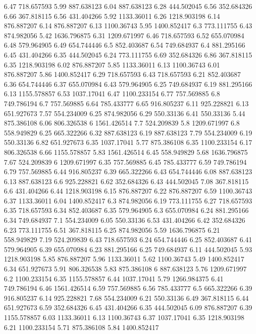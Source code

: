 6.47	718.657593
5.99	887.638123
6.04	887.638123
6.28	444.502045
6.56	352.684326
6.66	367.818115
6.56	431.404266
5.92	1133.36011
6.26	1218.903198
6.14	876.887207
6.14	876.887207
6.13	1100.36743
5.95	1400.852417
6.3	773.111755
6.43	874.982056
5.42	1636.796875
6.31	1209.671997
6.46	718.657593
6.52	655.070984
6.48	579.964905
6.49	654.744446
6.5	852.403687
6.54	749.684937
6.4	881.295166
6.45	431.404266
6.35	444.502045
6.24	773.111755
6.69	352.684326
6.86	367.818115
6.35	1218.903198
6.02	876.887207
5.85	1133.36011
6.13	1100.36743
6.01	876.887207
5.86	1400.852417
6.29	718.657593
6.43	718.657593
6.21	852.403687
6.36	654.744446
6.37	655.070984
6.43	579.964905
6.25	749.684937
6.19	881.295166
6.13	1155.578857
6.53	1037.17041
6.47	1100.233154
6.77	757.569885
6.8	749.786194
6.7	757.569885
6.64	785.433777
6.65	916.805237
6.11	925.228821
6.13	651.927673
7.57	554.234009
6.25	874.982056
6.29	550.33136
6.41	550.33136
5.44	875.386108
6.06	806.326538
6	1561.426514
7.7	524.209839
5.8	1209.671997
6.8	558.949829
6.25	665.322266
6.32	887.638123
6.19	887.638123
7.79	554.234009
6.19	550.33136
6.82	651.927673
6.35	1037.17041
5.77	875.386108
6.35	1100.233154
6.17	806.326538
6.66	1155.578857
5.83	1561.426514
6.45	558.949829
5.68	1636.796875
7.67	524.209839
6	1209.671997
6.35	757.569885
6.45	785.433777
6.59	749.786194
6.79	757.569885
6.44	916.805237
6.39	665.322266
6.43	654.744446
6.08	887.638123
6.13	887.638123
6.6	925.228821
6.62	352.684326
6.43	444.502045
7.08	367.818115
6.6	431.404266
6.44	1218.903198
6.15	876.887207
6.22	876.887207
6.59	1100.36743
6.37	1133.36011
6.04	1400.852417
6.3	874.982056
6.19	773.111755
6.27	718.657593
6.35	718.657593
6.34	852.403687
6.35	579.964905
6.3	655.070984
6.24	881.295166
6.34	749.684937
7.1	554.234009
6.05	550.33136
6.53	431.404266
6.42	352.684326
6.23	773.111755
6.51	367.818115
6.25	874.982056
5.59	1636.796875
6.21	558.949829
7.19	524.209839
6.43	718.657593
6.24	654.744446
6.25	852.403687
6.41	579.964905
6.39	655.070984
6.23	881.295166
6.25	749.684937
6.11	444.502045
5.93	1218.903198
5.85	876.887207
5.96	1133.36011
5.62	1100.36743
5.49	1400.852417
6.34	651.927673
5.91	806.326538
5.83	875.386108
6	887.638123
5.76	1209.671997
6.2	1100.233154
6.35	1155.578857
6.44	1037.17041
5.79	1266.984375
6.41	749.786194
6.46	1561.426514
6.59	757.569885
6.56	785.433777
6.5	665.322266
6.39	916.805237
6.14	925.228821
7.68	554.234009
6.21	550.33136
6.49	367.818115
6.44	651.927673
6.59	352.684326
6.45	431.404266
6.35	444.502045
6.09	876.887207
6.39	1155.578857
6.03	1133.36011
6.13	1100.36743
6.37	1037.17041
6.35	1218.903198
6.21	1100.233154
5.71	875.386108
5.84	1400.852417
